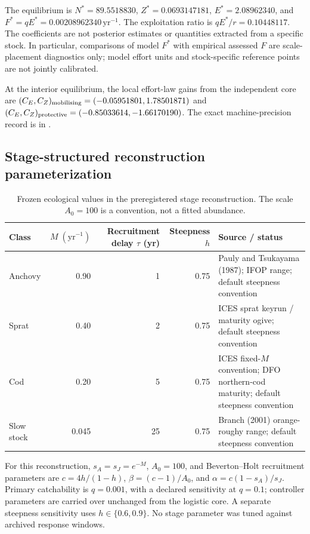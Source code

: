 The equilibrium is \(N^*=89.5518830\), \(Z^*=0.0693147181\), \(E^*=2.08962340\), and \(F^*=qE^*=0.00208962340\,\mathrm{yr}^{-1}\). The exploitation ratio is \(qE^*/r=0.10448117\). The coefficients are not posterior estimates or quantities extracted from a specific stock. In particular, comparisons of model \(F^*\) with empirical assessed \(F\) are scale-placement diagnostics only; model effort units and stock-specific reference points are not jointly calibrated.

At the interior equilibrium, the local effort-law gains from the independent core are \((C_E,C_Z)_{\rm mobilising}=(-0.05951801,1.78501871)\) and \((C_E,C_Z)_{\rm protective}=(-0.85033614,-1.66170190)\). The exact machine-precision record is in \texttt{}.

\subsection{Stage-structured reconstruction parameterization}
\begin{table}[htbp]
\centering\small
\caption{Frozen ecological values in the preregistered stage reconstruction. The scale \(A_0=100\) is a convention, not a fitted abundance.}
\label{tab:stage-parameters}
\begin{tabularx}{\linewidth}{@{}l r r r X@{}}
\toprule Class & \(M\;(\mathrm{yr}^{-1})\) & Recruitment delay \(\tau\) (yr) & Steepness \(h\) & Source / status \\
\midrule
Anchovy & 0.90 & 1 & 0.75 & Pauly and Tsukayama (1987); IFOP range; default steepness convention \\
Sprat & 0.40 & 2 & 0.75 & ICES sprat keyrun / maturity ogive; default steepness convention \\
Cod & 0.20 & 5 & 0.75 & ICES fixed-\(M\) convention; DFO northern-cod maturity; default steepness convention \\
Slow stock & 0.045 & 25 & 0.75 & Branch (2001) orange-roughy range; default steepness convention \\
\bottomrule
\end{tabularx}
\end{table}

For this reconstruction, \(s_A=s_J=e^{-M}\), \(A_0=100\), and Beverton--Holt recruitment parameters are \(c=4h/(1-h)\), \(\beta=(c-1)/A_0\), and \(\alpha=c(1-s_A)/s_J\). Primary catchability is \(q=0.001\), with a declared sensitivity at \(q=0.1\); controller parameters are carried over unchanged from the logistic core. A separate steepness sensitivity uses \(h\in\{0.6,0.9\}\). No stage parameter was tuned against archived response windows.
